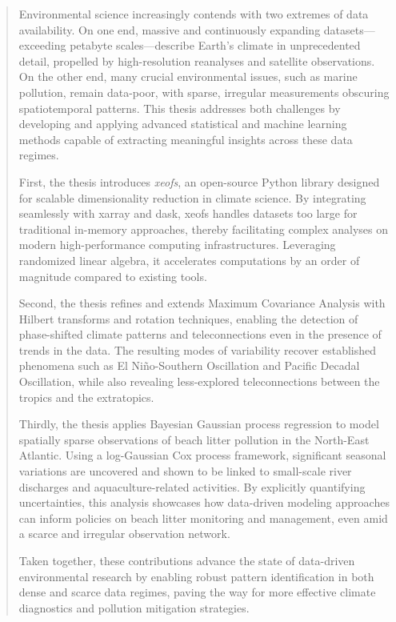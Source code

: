 \begin{abstract}
    Environmental science increasingly contends with two extremes of data availability. On one end, massive and continuously expanding datasets---exceeding petabyte scales---describe Earth's climate in unprecedented detail, propelled by high-resolution reanalyses and satellite observations. On the other end, many crucial environmental issues, such as marine pollution, remain data-poor, with sparse, irregular measurements obscuring spatiotemporal patterns. This thesis addresses both challenges by developing and applying advanced statistical and machine learning methods capable of extracting meaningful insights across these data regimes.

    First, the thesis introduces \textit{xeofs}, an open-source Python library designed for scalable dimensionality reduction in climate science. By integrating seamlessly with xarray and dask, xeofs handles datasets too large for traditional in-memory approaches, thereby facilitating complex analyses on modern high-performance computing infrastructures. Leveraging randomized linear algebra, it accelerates computations by an order of magnitude compared to existing tools. 
    
    Second, the thesis refines and extends Maximum Covariance Analysis with Hilbert transforms and rotation techniques, enabling the detection of phase-shifted climate patterns and teleconnections even in the presence of trends in the data. The resulting modes of variability recover established phenomena such as El Niño-Southern Oscillation and Pacific Decadal Oscillation, while also revealing less-explored teleconnections between the tropics and the extratopics. 
    
    Thirdly, the thesis applies Bayesian Gaussian process regression to model spatially sparse observations of beach litter pollution in the North-East Atlantic. Using a log-Gaussian Cox process framework, significant seasonal variations are uncovered and shown to be linked to small-scale river discharges and aquaculture-related activities. By explicitly quantifying uncertainties, this analysis showcases how data-driven modeling approaches can inform policies on beach litter monitoring and management, even amid a scarce and irregular observation network.
    
    Taken together, these contributions advance the state of data-driven environmental research by enabling robust pattern identification in both dense and scarce data regimes, paving the way for more effective climate diagnostics and pollution mitigation strategies.
\end{abstract}


